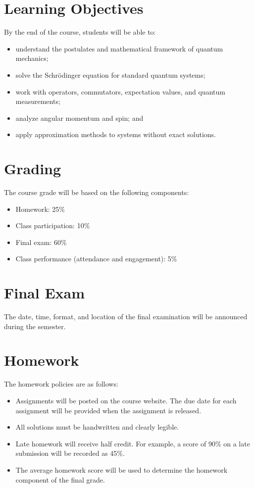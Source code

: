 \documentclass[UTF8]{ctexart}
\begin{document}
\section*{Learning Objectives}
By the end of the course, students will be able to:
\begin{itemize}
  \item understand the postulates and mathematical framework of quantum mechanics;
  \item solve the Schr\"odinger equation for standard quantum systems;
  \item work with operators, commutators, expectation values, and quantum measurements;
  \item analyze angular momentum and spin; and
  \item apply approximation methods to systems without exact solutions.
\end{itemize}

\section*{Grading}
The course grade will be based on the following components:
\begin{itemize}
  \item Homework: 25\%
  \item Class participation: 10\%
  \item Final exam: 60\%
  \item Class performance (attendance and engagement): 5\%
\end{itemize}

\section*{Final Exam}
The date, time, format, and location of the final examination will be announced during the semester.

\section*{Homework}
The homework policies are as follows:
\begin{itemize}
  \item Assignments will be posted on the course website. The due date for each assignment will be provided when the assignment is released.
  \item All solutions must be handwritten and clearly legible.
  \item Late homework will receive half credit. For example, a score of 90\% on a late submission will be recorded as 45\%.
  \item The average homework score will be used to determine the homework component of the final grade.
\end{itemize}
\end{document}
